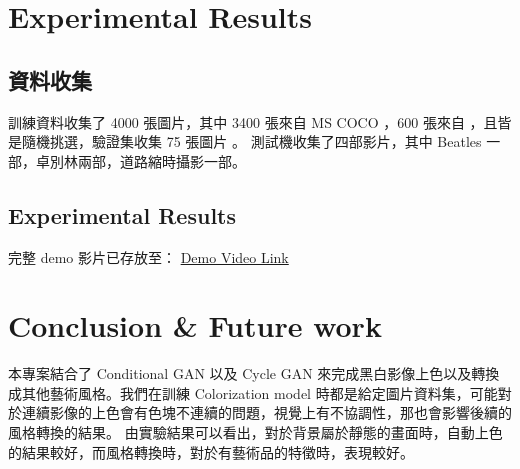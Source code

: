 \documentclass[a4paper, 12pt]{article}
\begin{document}
\begin{CJK}{UTF8}{bkai}
	\section{Experimental Results}

	\subsection{資料收集}

	訓練資料收集了 4000 張圖片，其中 3400 張來自 MS COCO \cite{mscoco}，600 張來自 \cite{lab2rgb}，且皆是隨機挑選，驗證集收集 75 張圖片 \cite{lab2rgb}。 測試機收集了四部影片，其中 Beatles 一部，卓別林兩部，道路縮時攝影一部。
	



	\subsection{Experimental Results}

	完整 demo 影片已存放至：
	\href{https://drive.google.com/drive/folders/1SVA7trdCwTGiufNew1d3kUPHCUO1aqrz?usp=drive_link}{Demo Video Link}

    \section{Conclusion \& Future work}

	本專案結合了 Conditional GAN 以及 Cycle GAN 來完成黑白影像上色以及轉換成其他藝術風格。我們在訓練 Colorization model 時都是給定圖片資料集，可能對於連續影像的上色會有色塊不連續的問題，視覺上有不協調性，那也會影響後續的風格轉換的結果。
	由實驗結果可以看出，對於背景屬於靜態的畫面時，自動上色的結果較好，而風格轉換時，對於有藝術品的特徵時，表現較好。

    
     
    
\end{CJK}
\end{document}
